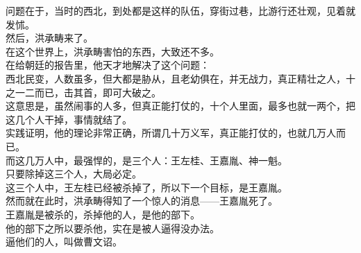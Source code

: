 \begin{multicols}{\theparacolNo}
问题在于，当时的西北，到处都是这样的队伍，穿街过巷，比游行还壮观，见着就发怵。\\

然后，洪承畴来了。\\

在这个世界上，洪承畴害怕的东西，大致还不多。\\

在给朝廷的报告里，他天才地解决了这个问题：\\

西北民变，人数虽多，但大都是胁从，且老幼俱在，并无战力，真正精壮之人，十之一二而已，击其首，即可大破之。\\

这意思是，虽然闹事的人多，但真正能打仗的，十个人里面，最多也就一两个，把这几个人干掉，事情就结了。\\

实践证明，他的理论非常正确，所谓几十万义军，真正能打仗的，也就几万人而已。\\

而这几万人中，最强悍的，是三个人：王左桂、王嘉胤、神一魁。\\

只要除掉这三个人，大局必定。\\

这三个人中，王左桂已经被杀掉了，所以下一个目标，是王嘉胤。\\

然而就在此时，洪承畴得知了一个惊人的消息——王嘉胤死了。\\

王嘉胤是被杀的，杀掉他的人，是他的部下。\\

他的部下之所以要杀他，实在是被人逼得没办法。\\

逼他们的人，叫做曹文诏。\\
\ifnum{}
	\end{multicols}
\fi
\newpage
